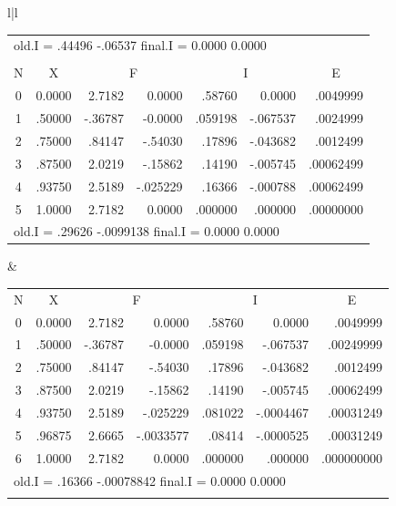 \begin{figure}[H]
\begin{tabular}{l|l}
\begin{tabular}{ccrrrrr}
            \multicolumn{7}{l}{old.I = .44496 -.06537 \hfill final.I = 0.0000 0.0000} \\
        \\
            \multicolumn{1}{c}{N} & \multicolumn{1}{c}{X} &
            \multicolumn{2}{c}{F} & \multicolumn{2}{c}{I} &
            \multicolumn{1}{c}{E} \\
            0 & 0.0000 & 2.7182  &  0.0000  & .58760  & 0.0000   & .0049999  \\
            1 & .50000 & -.36787 & -0.0000  & .059198 & -.067537 & .0024999  \\
            2 & .75000 & .84147  & -.54030  & .17896  & -.043682 & .0012499  \\
            3 & .87500 & 2.0219  & -.15862  & .14190  & -.005745 & .00062499 \\
            4 & .93750 & 2.5189  & -.025229 & .16366  & -.000788 & .00062499 \\
            5 & 1.0000 & 2.7182  & 0.0000   & .000000 &  .000000 & .00000000 \\
            \multicolumn{7}{l}{old.I = .29626 -.0099138 \hfill final.I = 0.0000 0.0000} \\
        \end{tabular}
      &
        \begin{tabular}{ccrrrrr}
            \multicolumn{1}{c}{N} & \multicolumn{1}{c}{X} &
            \multicolumn{2}{c}{F} & \multicolumn{2}{c}{I} &
            \multicolumn{1}{c}{E} \\
            0 & 0.0000 & 2.7182  &  0.0000   & .58760  & 0.0000    & .0049999   \\
            1 & .50000 & -.36787 & -0.0000   & .059198 & -.067537  & .00249999  \\
            2 & .75000 &  .84147 & -.54030   & .17896  & -.043682  & .0012499   \\
            3 & .87500 & 2.0219  & -.15862   & .14190  & -.005745  & .00062499  \\
            4 & .93750 & 2.5189  & -.025229  & .081022 & -.0004467 & .00031249  \\
            5 & .96875 & 2.6665  & -.0033577 & .08414  & -.0000525 & .00031249  \\
            6 & 1.0000 & 2.7182  & 0.0000    & .000000 &  .000000  & .000000000 \\
            \multicolumn{7}{l}{old.I = .16366 -.00078842 \hfill final.I = 0.0000 0.0000} \\
        \\

\end{tabular}
\end{tabular}
\end{figure}
